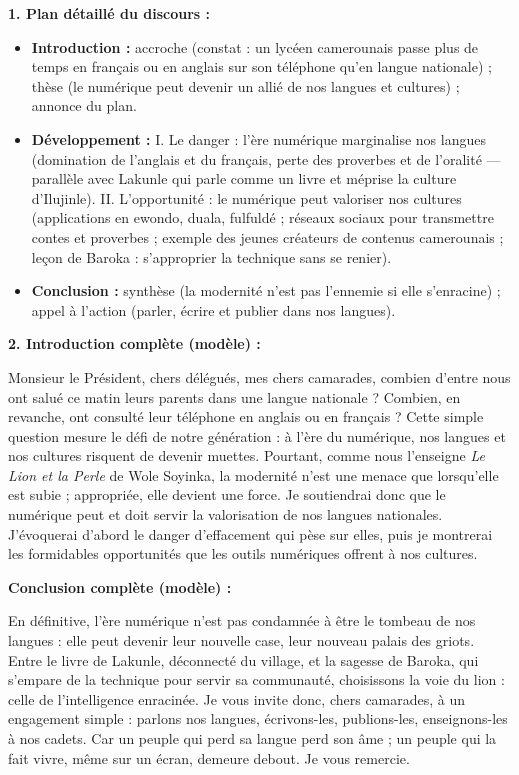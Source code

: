 \documentclass[11pt]{article}
\begin{document}
\begin{corrige}
\textbf{1. Plan détaillé du discours :}
\begin{itemize}
\item \textbf{Introduction :} accroche (constat : un lycéen camerounais passe plus de temps en français ou en anglais sur son téléphone qu'en langue nationale) ; thèse (le numérique peut devenir un allié de nos langues et cultures) ; annonce du plan.
\item \textbf{Développement :} I. Le danger : l'ère numérique marginalise nos langues (domination de l'anglais et du français, perte des proverbes et de l'oralité — parallèle avec Lakunle qui \og parle comme un livre \fg{} et méprise la culture d'Ilujinle). II. L'opportunité : le numérique peut valoriser nos cultures (applications en ewondo, duala, fulfuldé ; réseaux sociaux pour transmettre contes et proverbes ; exemple des jeunes créateurs de contenus camerounais ; leçon de Baroka : s'approprier la technique sans se renier).
\item \textbf{Conclusion :} synthèse (la modernité n'est pas l'ennemie si elle s'enracine) ; appel à l'action (parler, écrire et publier dans nos langues).
\end{itemize}

\textbf{2. Introduction complète (modèle) :}

\og Monsieur le Président, chers délégués, mes chers camarades, combien d'entre nous ont salué ce matin leurs parents dans une langue nationale ? Combien, en revanche, ont consulté leur téléphone en anglais ou en français ? Cette simple question mesure le défi de notre génération : à l'ère du numérique, nos langues et nos cultures risquent de devenir muettes. Pourtant, comme nous l'enseigne \emph{Le Lion et la Perle} de Wole Soyinka, la modernité n'est une menace que lorsqu'elle est subie ; appropriée, elle devient une force. Je soutiendrai donc que le numérique peut et doit servir la valorisation de nos langues nationales. J'évoquerai d'abord le danger d'effacement qui pèse sur elles, puis je montrerai les formidables opportunités que les outils numériques offrent à nos cultures. \fg

\textbf{Conclusion complète (modèle) :}

\og En définitive, l'ère numérique n'est pas condamnée à être le tombeau de nos langues : elle peut devenir leur nouvelle case, leur nouveau palais des griots. Entre le livre de Lakunle, déconnecté du village, et la sagesse de Baroka, qui s'empare de la technique pour servir sa communauté, choisissons la voie du lion : celle de l'intelligence enracinée. Je vous invite donc, chers camarades, à un engagement simple : parlons nos langues, écrivons-les, publions-les, enseignons-les à nos cadets. Car un peuple qui perd sa langue perd son âme ; un peuple qui la fait vivre, même sur un écran, demeure debout. Je vous remercie. \fg


\end{corrige}
\end{document}
